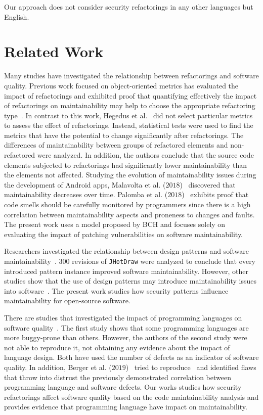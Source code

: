 \documentclass[10pt,conference]{IEEEtran}
\begin{document}
Our approach does not consider security refactorings in any other languages but
English.

\section{Related Work}\label{sec:rw}

Many studies have investigated the relationship between refactorings and
software quality. Previous work focused on object-oriented metrics has evaluated the
impact of refactorings and exhibited proof that quantifying effectively the
impact of refactorings on maintainability may help to choose the appropriate
refactoring type~\cite{1167822}. In contrast to this work, Hegedus et
al.~\cite{HEGEDUS2018313} did not select particular metrics to assess the effect
of refactorings. Instead, statistical tests were used to find the metrics that
have the potential to change significantly after refactorings. The differences
of maintainability between groups of refactored elements and non-refactored were
analyzed. In addition, the authors conclude that the source code elements
subjected to refactorings had significantly lower maintainability than the
elements not affected. Studying the evolution of maintainability issues during
the development of Android apps, Malavolta et al. ($2018$)~\cite{8530041}
discovered that maintainability decreases over time. Palomba et al.
($2018$)~\cite{Palomba:2018:DIM:3231288.3231337} exhibits proof that code smells
should be carefully monitored by programmers since there is a high correlation
between maintainability aspects and proneness to changes and faults. The present
work uses a model proposed by BCH and focuses solely on evaluating the impact of
patching vulnerabilities on software maintainability.

Researchers investigated the relationship between design patterns and software
maintainability~\cite{10.1007/978-3-642-35267-6-18}. $300$ revisions of
\texttt{JHotDraw} were analyzed to conclude that every introduced pattern
instance improved software maintainability. However, other studies show that the
use of design patterns may introduce maintainability issues into
software~\cite{4493325}. The present work studies how security patterns
influence maintainability for open-source software.

There are studies that investigated the impact of programming languages on software
quality~\cite{Ray:2014:LSS:2635868.2635922,Ray:2017:LSP:3144574.3126905}. The first
study shows that some programming languages are more buggy-prone than others. However,
the authors of the second study were not able to reproduce it, not obtaining any
evidence about the impact of language design. Both have used the number of
defects as an indicator of software quality. In addition,
Berger et al. ($2019$)~\cite{2019arXiv190110220B} tried to reproduce~\cite{Ray:2014:LSS:2635868.2635922,
Ray:2017:LSP:3144574.3126905} and identified flaws that throw into distrust the previously demonstrated
correlation between programming language and software defects. Our works studies how
security refactorings affect software quality based on the code maintainability
analysis and provides evidence that programming language have impact on
maintainability.
\end{document}
